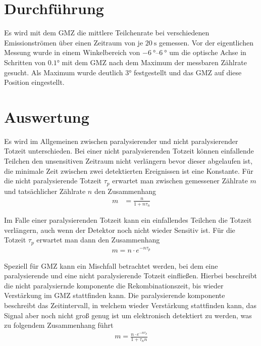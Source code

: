 \section{Durchführung}
Es wird mit dem GMZ die mittlere Teilchenrate bei verschiedenen Emissionströmen über einen Zeitraum von je $\SI{20}{\second}$  gemessen. Vor der eigentlichen Messung wurde in einem Winkelbereich von $\SIrange{-6}{6}{\degree}$ um die optische Achse in Schritten von $\ang{0,1}$ mit dem GMZ nach dem Maximum der messbaren Zählrate gesucht. Als Maximum wurde deutlich $\ang{3}$ festgestellt und das GMZ auf diese Position eingestellt.


\section{Auswertung}
Es wird im Allgemeinen zwischen paralysierender und nicht paralysierender Totzeit unterschieden. Bei einer nicht paralysierenden Totzeit können einfallende Teilchen den unsensitiven Zeitraum nicht verlängern bevor dieser abgelaufen ist, die minimale Zeit zwischen zwei detektierten Ereignissen ist eine Konstante. Für die nicht paralysierende Totzeit $\tau_p$ erwartet man zwischen gemessener Zählrate $m$ und tatsächlicher Zählrate $n$ den Zusammenhang \cite[776]{kolanoskiwermerdetektoren}
\begin{align}
	m &= \frac{n}{1 + n \tau_n}
\end{align}

Im Falle einer paralysierenden Totzeit kann ein einfallendes Teilchen die Totzeit verlängern, auch wenn der Detektor noch nicht wieder Sensitiv ist. Für die Totzeit $\tau_p$ erwartet man dann den Zusammenhang\cite[776]{kolanoskiwermerdetektoren}
\begin{align}
	m = n \cdot e^{- n \tau_p}
\end{align}

Speziell für GMZ kann ein Mischfall betrachtet werden, bei dem eine paralysierende und eine nicht paralysierende Totzeit einfließen. Hierbei beschreibt die nicht paralysiernde komponente die Rekombinationszeit, bis wieder Verstärkung im GMZ stattfinden kann. Die paralysierende komponente beschreibt das Zeitintervall, in welchem wieder Verstärkung stattfinden kann, das Signal aber noch nicht groß genug ist um elektronisch detektiert zu werden, was zu folgendem Zusammenhang führt\cite{gm_deadtime}
\begin{align}
	m = \frac{n \cdot e^{- n \tau_p}}{1 + \tau_n n}
\end{align}

